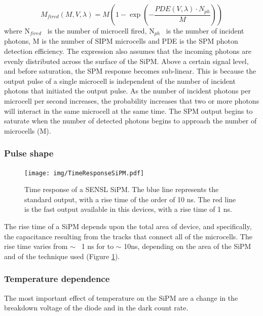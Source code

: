 \begin{equation}
M_{fired}(M,V,\lambda) = M \left( 1 - \exp\left({-\frac{PDE(V,\lambda) \cdot N_{ph}}{M}}\right)\right)
\end{equation}
%
where N$_{fired}$~ is the number of microcell fired, N$_{ph}$~ is the number of incident photons, M is the number of SIPM microcells and PDE is the SPM photon detection efficiency. The expression also assumes that the incoming photons are evenly distributed across the surface of the SiPM. Above a certain signal level, and before saturation, the SPM response becomes sub-linear. This is because the output pulse of a single microcell is independent of the number of incident photons that initiated the output pulse. As the number of incident photons per microcell per second increases, the probability increases that two or more photons will interact in the same microcell at the same time. The SPM output begins to saturate when the number of detected photons begins to approach the number of microcells (M).

\subsubsection*{Pulse shape}


\begin{figure}[!bhtp]
	\centering
	\texttt{[image: img/TimeResponseSiPM.pdf]}
	
	\caption{\label{fig.fr} Time response of a SENSL SiPM. The blue line represents the standard output, with a rise time of the order of 10 ns. The red line is the fast output available in this devices, with a rise time of 1 ns.}
\end{figure}

The rise time of a  SiPM depends upon the total area of device, and specifically, the capacitance resulting from the tracks that connect all of the microcells. The rise time varies from $\sim$~ 1 ns for to $\sim$ 10ns, depending on the area of the SiPM and of the technique used (Figure \ref{fig.fr}).

\subsubsection*{Temperature dependence}

The most important effect of temperature on the SiPM are a change in the breakdown voltage of the diode and in the dark count rate.

